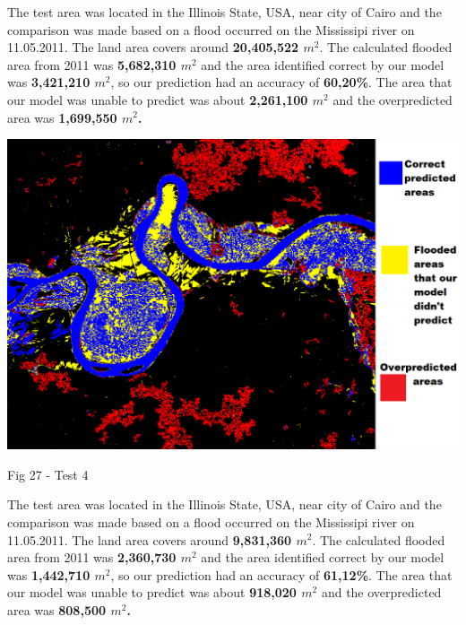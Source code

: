 \documentclass[12pt, a4paper]{report}
\begin{document}
The test area was located in the Illinois State, USA, near city of Cairo and the comparison was made based on a flood occurred on the Mississipi river on 11.05.2011. The land area covers around \textbf{20,405,522 $m^2$}. The calculated flooded area from 2011 was \textbf{5,682,310 $m^2$} and the area identified correct by our model was \textbf{3,421,210 $m^2$}, so our prediction had an accuracy of \textbf{60,20\%}. The area that our model was unable to predict was about \textbf{2,261,100 $m^2$} and the overpredicted area was \textbf{1,699,550 $m^2$.}

\newpage

\bigskip
\includegraphics[scale=0.5, center]{test_4.png}
\begin{center}
Fig 27 - Test 4 
\end{center}
\par 

The test area was located in the Illinois State, USA, near city of Cairo and the comparison was made based on a flood occurred on the Mississipi river on 11.05.2011. The land area covers around \textbf{9,831,360 $m^2$}. The calculated flooded area from 2011 was \textbf{2,360,730 $m^2$} and the area identified correct by our model was \textbf{1,442,710 $m^2$}, so our prediction had an accuracy of \textbf{61,12\%}. The area that our model was unable to predict was about \textbf{918,020 $m^2$} and the overpredicted area was \textbf{808,500 $m^2$.}

\newpage
\end{document}
